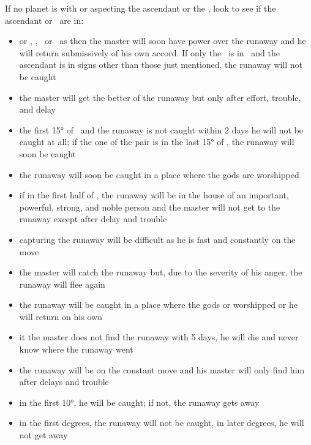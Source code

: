 If no planet is with or aspecting the ascendant or the \Moon, look to see if the ascendant or \Moon\, are in:
\begin{itemize}[topsep=0em,itemsep=0em]
\item[\Aries] or \Gemini, \Leo, \Sagittarius\, or \Pisces\, as then the master will soon have power over the runaway and he will return submissively of his own accord. If only the \Moon\, is in \Aries\, and the ascendant is in signs other than those just mentioned, the runaway will not be caught

\item[\Taurus] the master will get the better of the runaway but only after effort, trouble, and delay

\item[\Gemini] the first 15° of \Gemini\, and the runaway is not caught within 2 days he will not be caught at all; if the one of the pair is in the last 15° of \Gemini, the runaway will soon be caught

\item[\Cancer] the runaway will soon be caught in a place where the gods are worshipped

\item[\Leo] if in the first half of \Leo, the runaway will be in the house of an important, powerful, strong, and noble person and the master will not get to the runaway except after delay and trouble

\item[\Virgo] capturing the runaway will be difficult as he is fast and constantly on the move

\item[\Libra] the master will catch the runaway but, due to the severity of his anger, the runaway will flee again

\item[\Scorpio] the runaway will be caught in a place where the gods or worshipped or he will return on his own

\item[\Sagittarius]  it the master does not find the runaway with 5 days, he will die and never know where the runaway went

\item[\Capricorn] the runaway will be on the constant move and his master will only find him after delays and trouble

\item[\Aquarius] in the first 10°, he will be caught; if not, the runaway gets away

\item[\Pisces] in the first degrees, the runaway will not be caught, in later degrees, he will not get away
\end{itemize}

